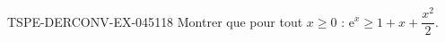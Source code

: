 \begin{exercice}{TSPE-DERCONV-EX-045}{1}{18}
Montrer que pour tout $x \geq 0$ : $\mathrm{e}^x \geq 1 + x + \dfrac{x^2}{2}$.

\end{exercice}
